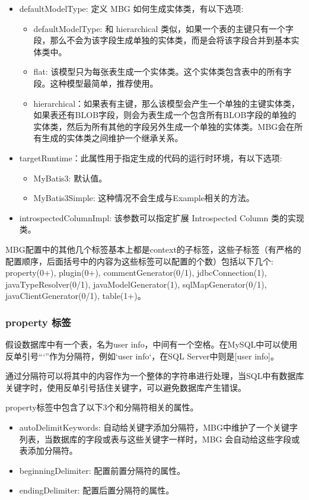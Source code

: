 \begin{itemize}
    \item defaultModelType: 定义 MBG 如何生成实体类，有以下选项:
    \begin{itemize}
        \item defaultModelType: 和 hierarchical 类似，如果一个表的主键只有一个字段，那么不会为该字段生成单独的实体类，而是会将该字段合并到基本实体类中。
        \item flat: 该模型只为每张表生成一个实体类。这个实体类包含表中的所有字段。这种模型最简单，推荐使用。
        \item hierarchical：如果表有主键，那么该模型会产生一个单独的主键实体类，如果表还有BLOB字段，则会为表生成一个包含所有BLOB字段的单独的实体类，然后为所有其他的字段另外生成一个单独的实体类。MBG会在所有生成的实体类之间维护一个继承关系。
    \end{itemize}
    \item  targetRuntime：此属性用于指定生成的代码的运行时环境，有以下选项:
    \begin{itemize}
        \item MyBatis3: 默认值。
        \item MyBatis3Simple: 这种情况不会生成与Example相关的方法。
    \end{itemize}
    \item introspectedColumnImpl: 该参数可以指定扩展 Introspected Column 类的实现类。
\end{itemize}

MBG配置中的其他几个标签基本上都是context的子标签，这些子标签（有严格的配置顺序，后面括号中的内容为这些标签可以配置的个数）包括以下几个: property(0+), plugin(0+), commentGenerator(0/1), jdbcConnection(1), javaTypeResolver(0/1), javaModelGenerator(1), sqlMapGenerator(0/1), javaClientGenerator(0/1), table(1+)。

\subsubsection*{property 标签}

假设数据库中有一个表，名为user info，中间有一个空格。在MySQL中可以使用反单引号“`”作为分隔符，例如`user info`，在SQL Server中则是[user info]。

通过分隔符可以将其中的内容作为一个整体的字符串进行处理，当SQL中有数据库关键字时，使用反单引号括住关键字，可以避免数据库产生错误。

property标签中包含了以下3个和分隔符相关的属性。
\begin{itemize}
    \item autoDelimitKeywords: 自动给关键字添加分隔符，MBG中维护了一个关键字列表，当数据库的字段或表与这些关键字一样时，MBG 会自动给这些字段或表添加分隔符。
    \item beginningDelimiter: 配置前置分隔符的属性。
    \item endingDelimiter: 配置后置分隔符的属性。
\end{itemize}


